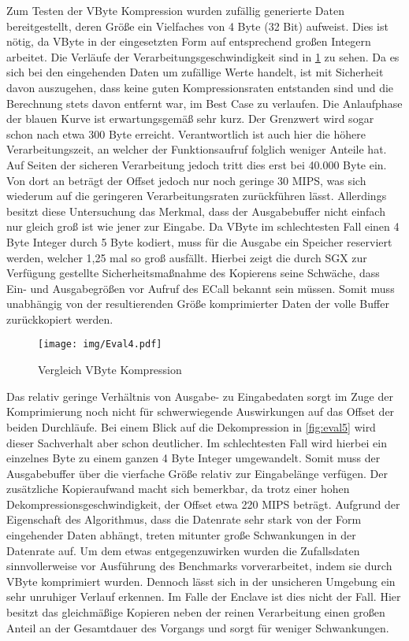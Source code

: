 Zum Testen der VByte Kompression wurden zufällig generierte Daten bereitgestellt, deren Größe ein Vielfaches von 4 Byte (32 Bit) aufweist. Dies ist nötig, da VByte in der eingesetzten Form auf entsprechend großen Integern arbeitet. Die Verläufe der Verarbeitungsgeschwindigkeit sind in \ref{fig:eval4} zu sehen. Da es sich bei den eingehenden Daten um zufällige Werte handelt, ist mit Sicherheit davon auszugehen, dass keine guten Kompressionsraten entstanden sind und die Berechnung stets davon entfernt war, im Best Case zu verlaufen. Die Anlaufphase der blauen Kurve ist erwartungsgemäß sehr kurz. Der Grenzwert wird sogar schon nach etwa 300 Byte erreicht. Verantwortlich ist auch hier die höhere Verarbeitungszeit, an welcher der Funktionsaufruf folglich weniger Anteile hat. Auf Seiten der sicheren Verarbeitung jedoch tritt dies erst bei 40.000 Byte ein. Von dort an beträgt der Offset jedoch nur noch geringe 30 \ac{MIPS}, was sich wiederum auf die geringeren Verarbeitungsraten zurückführen lässt. Allerdings besitzt diese Untersuchung das Merkmal, dass der Ausgabebuffer nicht einfach nur gleich groß ist wie jener zur Eingabe. Da VByte im schlechtesten Fall einen 4 Byte Integer durch 5 Byte kodiert, muss für die Ausgabe ein Speicher reserviert werden, welcher 1,25 mal so groß ausfällt. Hierbei zeigt die durch \ac{SGX} zur Verfügung gestellte Sicherheitsmaßnahme des Kopierens seine Schwäche, dass Ein- und Ausgabegrößen vor Aufruf des \ac{ECall} bekannt sein müssen. Somit muss unabhängig von der resultierenden Größe komprimierter Daten der volle Buffer zurückkopiert werden.

\begin{figure}[h]
	\texttt{[image: img/Eval4.pdf]}
	\centering
	\caption{Vergleich VByte Kompression}
	\label{fig:eval4}
\end{figure}

Das relativ geringe Verhältnis von Ausgabe- zu Eingabedaten sorgt im Zuge der Komprimierung noch nicht für schwerwiegende Auswirkungen auf das Offset der beiden Durchläufe. Bei einem Blick auf die Dekompression in \ref{fig:eval5} wird dieser Sachverhalt aber schon deutlicher. Im schlechtesten Fall wird hierbei ein einzelnes Byte zu einem ganzen 4 Byte Integer umgewandelt. Somit muss der Ausgabebuffer über die vierfache Größe relativ zur Eingabelänge verfügen. Der zusätzliche Kopieraufwand macht sich bemerkbar, da trotz einer hohen Dekompressionsgeschwindigkeit, der Offset etwa 220 \ac{MIPS} beträgt. Aufgrund der Eigenschaft des Algorithmus, dass die Datenrate sehr stark von der Form eingehender Daten abhängt, treten mitunter große Schwankungen in der Datenrate auf. Um dem etwas entgegenzuwirken wurden die Zufallsdaten sinnvollerweise vor Ausführung des Benchmarks vorverarbeitet, indem sie durch VByte komprimiert wurden. Dennoch lässt sich in der unsicheren Umgebung ein sehr unruhiger Verlauf erkennen. Im Falle der Enclave ist dies nicht der Fall. Hier besitzt das gleichmäßige Kopieren neben der reinen Verarbeitung einen großen Anteil an der Gesamtdauer des Vorgangs und sorgt für weniger Schwankungen.

